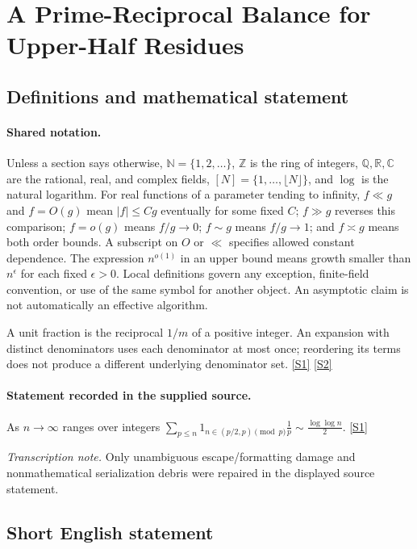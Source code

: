\documentclass[11pt,a4paper]{article}
\newcommand{\N}{\mathbb{N}}
\newcommand{\Z}{\mathbb{Z}}
\newcommand{\Q}{\mathbb{Q}}
\newcommand{\R}{\mathbb{R}}
\newcommand{\C}{\mathbb{C}}
\newcommand{\sref}[2]{\hyperlink{source:#1:#2}{[S#2]}}
\begin{document}
\section{A Prime-Reciprocal Balance for Upper-Half Residues}\label{statement}


\subsection{Definitions and mathematical statement}

\paragraph{Shared notation.}Unless a section says otherwise, $\N=\{1,2,\ldots\}$,
$\Z$ is the ring of integers, $\Q,\R,\C$ are the rational, real, and complex
fields, $[N]=\{1,\ldots,\lfloor N\rfloor\}$, and $\log$ is the natural
logarithm. For real functions of a parameter tending to infinity,
$f\ll g$ and $f=O(g)$ mean $|f|\leq Cg$ eventually for some fixed $C$;
$f\gg g$ reverses this comparison; $f=o(g)$ means $f/g\to0$;
$f\sim g$ means $f/g\to1$; and $f\asymp g$ means both order bounds.
A subscript on $O$ or $\ll$ specifies allowed constant dependence.
The expression $n^{o(1)}$ in an upper bound means growth smaller than
$n^\epsilon$ for each fixed $\epsilon>0$. Local definitions govern any
exception, finite-field convention, or use of the same symbol for another
object. An asymptotic claim is not automatically an effective algorithm.



A unit fraction is the reciprocal $1/m$ of a positive integer. An expansion with distinct denominators uses each denominator at most once; reordering its terms does not produce a different underlying denominator set. \sref{statement}{1} \sref{statement}{2}

\paragraph{Statement recorded in the supplied source.}
As $n\to \infty$ ranges over integers $ \sum_{p\leq n}1_{n\in (p/2,p)\pmod{p}}\frac{1}{p}\sim \frac{\log\log n}{2}. $ \sref{statement}{1}

{\small\emph{Transcription note.} Only unambiguous escape/formatting damage and nonmathematical serialization debris were repaired in the displayed source statement.}

\subsection{Short English statement}
\end{document}
